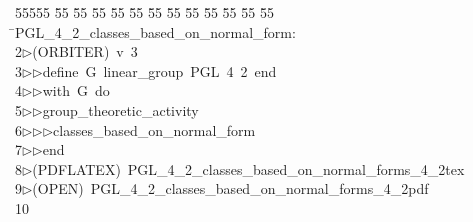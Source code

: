 %
%
\begin{tabbing}
55555 \= 55 \= 55 \= 55 \= 55 \= 55 \= 55 \= 55 \= 55 \= 55 \= 55 \= 55 \= 55 \= \>PGL\_4\_2\_classes\_based\_on\_normal\_form:\\[0pt]
2\>$\triangleright$\>(ORBITER)\ v\ 3\ \\[0pt]
3\>$\triangleright$\>$\triangleright$\>define\ G\ linear\_group\ PGL\ 4\ 2\ end\ \\[0pt]
4\>$\triangleright$\>$\triangleright$\>with\ G\ do\ \\[0pt]
5\>$\triangleright$\>$\triangleright$\>group\_theoretic\_activity\ \\[0pt]
6\>$\triangleright$\>$\triangleright$\>$\triangleright$\>classes\_based\_on\_normal\_form\ \\[0pt]
7\>$\triangleright$\>$\triangleright$\>end\\[0pt]
8\>$\triangleright$\>(PDFLATEX)\ PGL\_4\_2\_classes\_based\_on\_normal\_forms\_4\_2tex\\[0pt]
9\>$\triangleright$\>(OPEN)\ PGL\_4\_2\_classes\_based\_on\_normal\_forms\_4\_2pdf\\[0pt]
10\>\end{tabbing}
